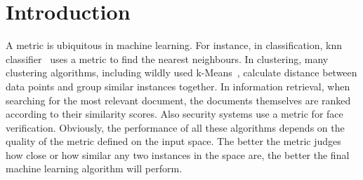 \documentclass[12pt,a4paper]{report}
\begin{document}



\tableofcontents







\chapter{Introduction} \label{chap:intro}



A metric is ubiquitous in machine learning. For instance, in classification, \ac{knn} classifier~\citep{cover1967nearest} uses a metric to find the nearest neighbours. In clustering, many clustering algorithms, including wildly used k-Means~\citep{hartigan1979algorithm}, calculate distance between data points and group similar instances together. In information retrieval, when searching for the most relevant document, the documents themselves are ranked according to their similarity scores. Also security systems use a metric for face verification. Obviously, the performance of all these algorithms depends on the quality of the metric defined on the input space. The better the metric judges how close or how similar any two instances in the space are, the better the final machine learning algorithm will perform.
\end{document}
